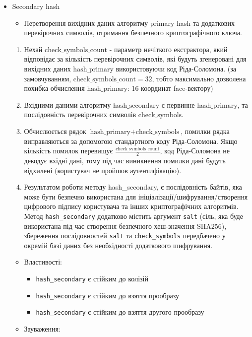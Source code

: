 \documentclass[11pt]{article}
\providecommand{\tightlist}{%
      \setlength{\itemsep}{0pt}\setlength{\parskip}{0pt}}
\begin{document}
    \begin{itemize}
\tightlist
\item
  Secondary hash

  \begin{itemize}
  \tightlist
  \item
    Перетворення вихідних даних алгоритму primary hash та додаткових
    перевірочних символів, отримання безпечного криптографічного ключа.
  \end{itemize}

  \begin{enumerate}
  \def\labelenumi{\arabic{enumi}.}
  \tightlist
  \item
    Нехай \(\text{check_symbols_count}\) - параметр нечіткого
    екстрактора, який відповідає за кількість перевірочних символів, які
    будуть згенеровані для вихідних даних \(\text{hash_primary}\)
    використовуючи код Ріда-Соломона. (за замовчуванням,
    \(\text{check_symbols_count} = 32\), тобто максимально дозволена
    похибка обчислення \(\text{hash_primary}\): 16 координат
    face-вектору)
  \item
    Вхідними даними алгоритму \(\text{hash_secondary}\) є первинне
    \(\text{hash_primary}\), та послідовність перевірочних символів
    \(\text{check_symbols}\).
  \item
    Обчислюється рядок \(\text{hash_primary}+\text{check_symbols}\),
    помилки рядка виправляються за допомогою стандартного коду
    Ріда-Соломона. Якщо кількість помилок перевищує
    \(\frac{\text{check_symbols_count}}{2}\), код Ріда-Соломона не
    декодує вхідні дані, тому під час виникнення помилки дані будуть
    відхилені (користувач не пройшов аутентифікацію).
  \item
    Результатом роботи методу hash\_secondary, є послідовність байтів,
    яка може бути безпечно використана для
    ініціалізації/шифрування/створення цифрового підпису користувача та
    інших криптографічних алгоритмів. Метод \texttt{hash\_secondary}
    додатково містить аргумент \texttt{salt} (сіль, яка буде використана
    під час створення безпечного хеш-значення SHA256), збереження
    послідовностей \texttt{salt} та \texttt{check\_symbols} передбачено
    у окремій базі даних без необхідності додаткового шифрування.
  \end{enumerate}

  \begin{itemize}
  \tightlist
  \item
    Властивості:

    \begin{itemize}
    \tightlist
    \item
      \texttt{hash\_secondary} є стійким до колізій
    \item
      \texttt{hash\_secondary} є стійким до взяття прообразу
    \item
      \texttt{hash\_secondary} є стійким до взяття другого прообразу
    \end{itemize}
  \item
    Зауваження:


\end{itemize}
\end{itemize}
\end{document}
